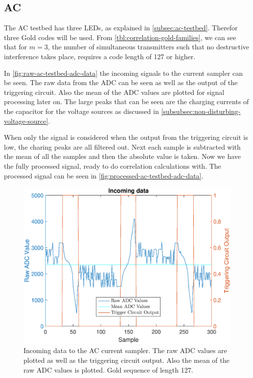 
\subsection{AC}


The AC testbed has three LEDs, as explained in \autoref{subsec:ac-testbed}.
Therefor three Gold codes will be used.
From \autoref{tbl:correlation-gold-families}, we can see that for $m = 3$, the number of simultaneous transmitters such that no destructive interference takes place, requires a code length of 127 or higher.

In \autoref{fig:raw-ac-testbed-adc-data} the incoming signals to the current sampler can be seen.
The raw data from the ADC can be seen as well as the output of the triggering circuit.
Also the mean of the ADC values are plotted for signal processing later on.
The large peaks that can be seen are the charging currents of the capacitor for the voltage sources as discussed in \autoref{subsubsec:non-disturbing-voltage-source}.

When only the signal is considered when the output from the triggering circuit is low, the charing peaks are all filtered out.
Next each sample is subtracted with the mean of all the samples and then the absolute value is taken.
Now we have the fully processed signal, ready to do correlation calculations with.
The processed signal can be seen in \autoref{fig:processed-ac-testbed-adc-data}.



\begin{figure}[tbp]
  \centering
  \includegraphics[width=\textwidth]{chapters/evaluation-chapters/hardware/ac/raw-ac-testbed-adc-data.eps}
    \caption{Incoming data to the AC current sampler. The raw ADC values are plotted as well as the triggering circuit output. Also the mean of the raw ADC values is plotted. Gold sequence of length 127.}
  \label{fig:raw-ac-testbed-adc-data}
\end{figure}


